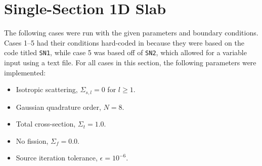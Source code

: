 \documentclass{NE515}
\theoremstyle{definition}
\begin{document}
    \section{Single-Section 1D Slab}
    The following cases were run with the given parameters and boundary conditions.
    Cases 1--5 had their conditions hard-coded in because they were based on the code titled \texttt{SN1}, while case 5 was based off of \texttt{SN2}, which allowed for a variable input using a text file.
    For all cases in this section, the following parameters were implemented:
    \begin{itemize}
        \item Isotropic scattering, $\Sigma_{s,l}=0$ for $l\geq 1$.
        \item Gaussian quadrature order, $N=8$.
        \item Total cross-section, $\Sigma_t=1.0$.
        \item No fission, $\Sigma_f=0.0$.
        \item Source iteration tolerance, $\epsilon=10^{-6}$.
    \end{itemize}
\end{document}
